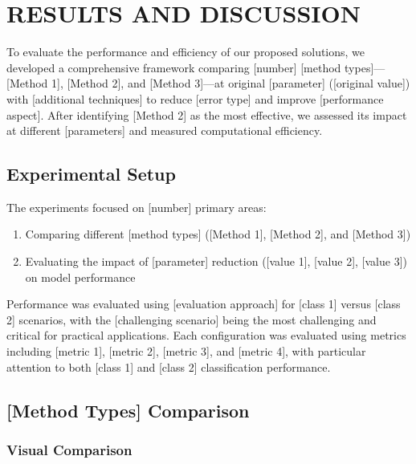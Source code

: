 \chapter{RESULTS AND DISCUSSION}

To evaluate the performance and efficiency of our proposed solutions, we developed a comprehensive framework comparing [number] [method types]—[Method 1], [Method 2], and [Method 3]—at original [parameter] ([original value]) with [additional techniques] to reduce [error type] and improve [performance aspect]. After identifying [Method 2] as the most effective, we assessed its impact at different [parameters] and measured computational efficiency.

\section{Experimental Setup}

The experiments focused on [number] primary areas:
\begin{enumerate}
\item Comparing different [method types] ([Method 1], [Method 2], and [Method 3])
\item Evaluating the impact of [parameter] reduction ([value 1], [value 2], [value 3]) on model performance
\end{enumerate}

Performance was evaluated using [evaluation approach] for [class 1] versus [class 2] scenarios, with the [challenging scenario] being the most challenging and critical for practical applications. Each configuration was evaluated using metrics including [metric 1], [metric 2], [metric 3], and [metric 4], with particular attention to both [class 1] and [class 2] classification performance.

\section{[Method Types] Comparison}

\subsection{Visual Comparison}



